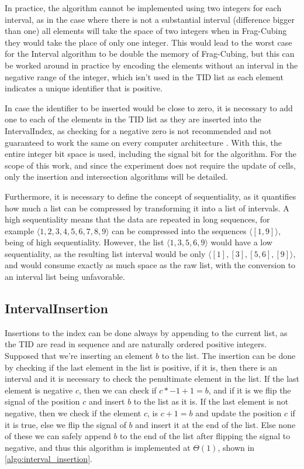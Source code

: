 In practice, the algorithm cannot be implemented using two integers for each interval, as in the case where there is not a substantial interval (difference bigger than one) all elements will take the space of two integers when in Frag-Cubing they would take the place of only one integer.
This would lead to the worst case for the Interval algorithm to be double the memory of Frag-Cubing, but this can be worked around in practice by encoding the elements without an interval in the negative range of the integer, which isn't used in the TID list as each element indicates a unique identifier that is positive.

In case the identifier to be inserted would be close to zero, it is necessary to add one to each of the elements in the TID list as they are inserted into the IntervalIndex, as checking for a negative zero is not recommended and not guaranteed to work the same on every computer architecture \cite{ieeeIEEEStandardFloatingPoint2019}.
With this, the entire integer bit space is used, including the signal bit for the algorithm.
For the scope of this work, and since the experiment does not require the update of cells, only the insertion and intersection algorithms will be detailed.

Furthermore, it is necessary to define the concept of sequentiality, as it quantifies how much a list can be compressed by transforming it into a list of intervals.
A high sequentiality means that the data are repeated in long sequences, for example $\langle 1, 2, 3, 4, 5, 6, 7, 8, 9 \rangle$ can be compressed into the sequences $\langle [1, 9] \rangle$, being of high sequentiality.
However, the list $\langle 1, 3, 5, 6, 9\rangle$ would have a low sequentiality, as the resulting list interval would be only $\langle [1], [3], [5, 6], [9] \rangle$, and would consume exactly as much space as the raw list, with the conversion to an interval list being unfavorable.

\subsection{IntervalInsertion}\label{ch:interval:algo:insertion}

Insertions to the index can be done always by appending to the current list, as the TID are read in sequence and are naturally ordered positive integers.
Supposed that we're inserting an element $b$ to the list.
The insertion can be done by checking if the last element in the list is positive, if it is, then there is an interval and it is necessary to check the penultimate element in the list.
If the last element is negative $c$, then we can check if $c * -1 + 1 = b$, and if it is we flip the signal of the position $c$ and insert $b$ to the list as it is.
If the last element is not negative, then we check if the element $c$, is $c + 1 = b$ and update the position $c$ if it is true, else we flip the signal of $b$ and insert it at the end of the list.
Else none of these we can safely append $b$ to the end of the list after flipping the signal to negative, and thus this algorithm is implemented at $\Theta(1)$, shown in \autoref{algo:interval_insertion}.

